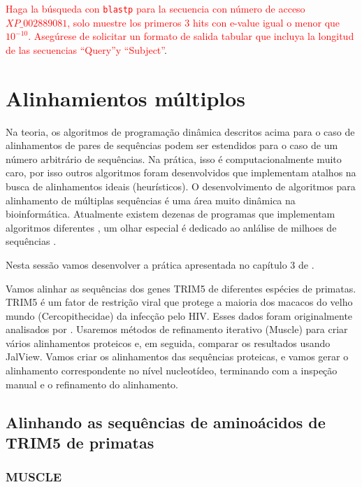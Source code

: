 \documentclass[letter,11pt]{book}
\begin{document}
\textcolor{red}{Haga la búsqueda con \Verb+blastp+ para la secuencia con número de acceso $XP\_002889081$, solo muestre los primeros 3 hits con e-value igual o menor que $10^{-10}$. Asegúrese de solicitar un formato de salida tabular que incluya la longitud de las secuencias ``Query''y ``Subject''}.

\chapter{Alinhamientos múltiplos}

Na teoria, os algoritmos de programação dinâmica descritos acima para o caso de alinhamentos de pares de sequências podem ser estendidos para o caso de um número arbitrário de sequências. Na prática, isso é computacionalmente muito caro, por isso outros algoritmos foram desenvolvidos que implementam atalhos na busca de alinhamentos ideais (heurísticos). O desenvolvimento de algoritmos para alinhamento de múltiplas sequências é uma área muito dinâmica na bioinformática. Atualmente existem dezenas de programas que implementam algoritmos diferentes \citetext{olha\citealp{Notredame2007} e \citealp{Lemey2009} para uma revisão recente do tópico}, um olhar especial é dedicado ao anlálise de milhoes de sequências \citep{Santus2023}.

Nesta sessão vamos desenvolver a prática apresentada no capítulo 3 de \citealp{Lemey2009}.

Vamos alinhar as sequências dos genes TRIM5 de diferentes espécies de primatas. TRIM5 é um fator de restrição viral que protege a maioria dos macacos do velho mundo (Cercopithecidae) da infecção pelo HIV. Esses dados foram originalmente analisados por \citealp{Sawyer2005}. Usaremos métodos de refinamento iterativo ({\sc Muscle}) para criar vários alinhamentos proteicos e, em seguida, comparar os resultados usando {\sc JalView}. Vamos criar os alinhamentos das sequências proteicas, e vamos gerar o alinhamento correspondente no nível nucleotídeo, terminando com a inspeção manual e o refinamento do alinhamento.

\section{Alinhando as sequências de aminoácidos de TRIM5 de primatas}

\subsection{{\sc MUSCLE}}
\end{document}
